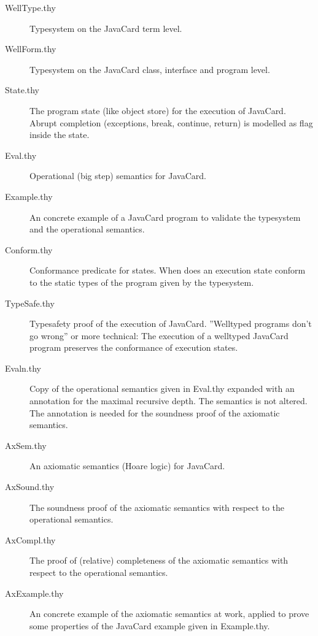 \documentclass[11pt,a4paper]{book}
\begin{document}
\begin{description}
\item[WellType.thy]
Typesystem on the JavaCard term level.

\item[WellForm.thy]
Typesystem on the JavaCard class, interface and program level.

\item[State.thy]
The program state (like object store) for the execution of JavaCard.
Abrupt completion (exceptions, break, continue, return) is modelled as flag
inside the state.

\item[Eval.thy]
Operational (big step) semantics for JavaCard.

\item[Example.thy]
An concrete example of a JavaCard program to validate the typesystem and the
operational semantics.

\item[Conform.thy]
Conformance predicate for states. When does an execution state conform to the
static types of the program given by the typesystem.

\item[TypeSafe.thy]
Typesafety proof of the execution of JavaCard. ''Welltyped programs don't go
wrong'' or more technical: The execution of a welltyped JavaCard program 
preserves the conformance of execution states.

\item[Evaln.thy]
Copy of the operational semantics given in Eval.thy expanded with an annotation
for the maximal recursive depth. The semantics is not altered. The annotation
is needed for the soundness proof of the axiomatic semantics.

\item[AxSem.thy]
An axiomatic semantics (Hoare logic) for JavaCard.

\item[AxSound.thy]
The soundness proof of the axiomatic semantics with respect to the operational
semantics.

\item[AxCompl.thy]
The proof of (relative) completeness of the axiomatic semantics with respect
to the operational semantics. 

\item[AxExample.thy]
An concrete example of the axiomatic semantics at work, applied to prove 
some properties of the JavaCard example given in Example.thy.
\end{description}
\end{document}
